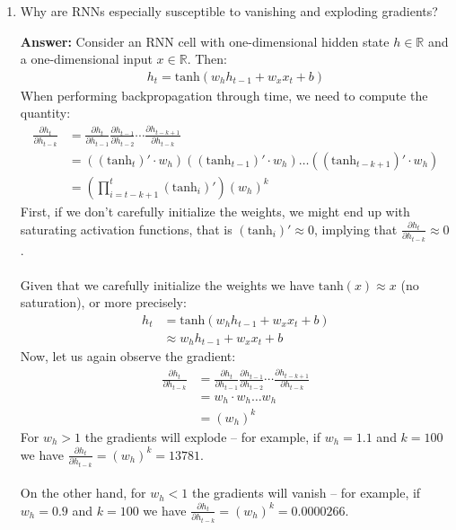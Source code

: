 \documentclass{article}
\newenvironment{QandA}{\begin{enumerate}[label=\arabic*.]}{\end{enumerate}}
\newenvironment{InnerQandA}{\begin{enumerate}[label=\roman*.]}{\end{enumerate}}
\newenvironment{answer}{\par\normalfont \textbf{Answer:}}{}
\newcommand{\R}{\mathbb{R}}
\begin{document}
\begin{QandA}
\begin{InnerQandA}
        \item Why are RNNs especially susceptible to vanishing and exploding gradients?
        \begin{answer}
            Consider an RNN cell with one-dimensional hidden state $h \in \R$ and a one-dimensional input $x \in \R$. Then:
            \begin{align*}
                h_t = \text{tanh} \left(w_h h_{t-1} + w_x x_t + b \right)
            \end{align*}
            When performing backpropagation through time, we need to compute the quantity:
            \begin{align*}
                \frac{\partial h_t}{\partial h_{t-k}} &= \frac{\partial h_t}{\partial h_{t-1}} \frac{\partial h_{t-1}}{\partial h_{t-2}} \cdots \frac{\partial h_{t-k+1}}{\partial h_{t-k}} \\
                &= \left( (\text{tanh}_t)' \cdot w_h \right) \left( (\text{tanh}_{t-1})' \cdot w_h \right) \ldots \left( (\text{tanh}_{t-k+1})' \cdot w_h \right) \\
                &= \left(\prod_{i=t-k+1}^t (\text{tanh}_{i})' \right) (w_h)^k  
            \end{align*}
            First, if we don't carefully initialize the weights, we might end up with saturating activation functions, that is $(\text{tanh}_i)' \approx 0$, implying that $\frac{\partial h_t}{\partial h_{t-k}} \approx 0 $. \\\\
            Given that we carefully initialize the weights we have $\text{tanh}(x) \approx x$ (no saturation), or more precisely:
            \begin{align*}
                h_t &= \text{tanh} \left(w_h h_{t-1} + w_x x_t + b \right) \\
                &\approx w_h h_{t-1} + w_x x_t + b
            \end{align*}
            Now, let us again observe the gradient:
            \begin{align*}
                \frac{\partial h_t}{\partial h_{t-k}} &= \frac{\partial h_t}{\partial h_{t-1}} \frac{\partial h_{t-1}}{\partial h_{t-2}} \cdots \frac{\partial h_{t-k+1}}{\partial h_{t-k}} \\
                &= w_h \cdot w_h \ldots  w_h \\
                &= (w_h)^k  
            \end{align*}
            For $w_h > 1$ the gradients will explode -- for example, if $w_h = 1.1$ and $k = 100$ we have $\frac{\partial h_t}{\partial h_{t-k}} = (w_h)^k = 13781$. \\\\
            On the other hand, for $w_h < 1$ the gradients will vanish -- for example, if $w_h = 0.9$ and $k = 100$ we have $\frac{\partial h_t}{\partial h_{t-k}} = (w_h)^k = 0.0000266$.
        \end{answer}
    \end{InnerQandA}


\end{QandA}
\end{document}
